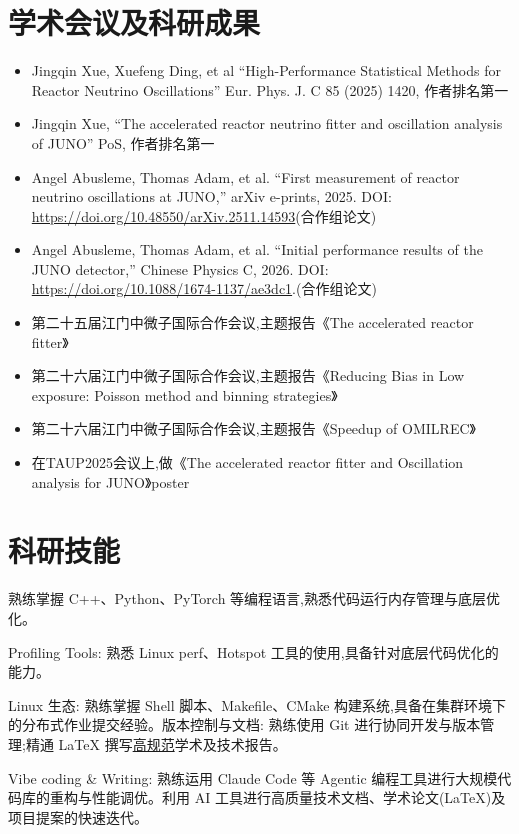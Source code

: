 \documentclass[a4paper,10.5pt]{article}
\begin{document}
\section*{学术会议及科研成果}

\begin{itemize}
    \item Jingqin Xue, Xuefeng Ding, et al ``High-Performance Statistical Methods for Reactor Neutrino Oscillations'' Eur. Phys. J. C 85 (2025) 1420, 作者排名第一
    \item Jingqin Xue, ``The accelerated reactor neutrino fitter and oscillation analysis of JUNO'' PoS, 作者排名第一
    \item Angel Abusleme, Thomas Adam, et al. ``First measurement of reactor neutrino oscillations at JUNO,'' arXiv e-prints, 2025. DOI: \url{https://doi.org/10.48550/arXiv.2511.14593}(合作组论文)
    \item Angel Abusleme, Thomas Adam, et al. ``Initial performance results of the JUNO detector,'' Chinese Physics C, 2026. DOI: \url{https://doi.org/10.1088/1674-1137/ae3dc1}.(合作组论文)
    \item 第二十五届江门中微子国际合作会议,主题报告《The accelerated reactor fitter》
    \item 第二十六届江门中微子国际合作会议,主题报告《Reducing Bias in Low exposure: Poisson method and binning strategies》
    \item 第二十六届江门中微子国际合作会议,主题报告《Speedup of OMILREC》
    \item 在TAUP2025会议上,做《The accelerated reactor fitter and Oscillation analysis for JUNO》poster
\end{itemize}

\section*{科研技能}

\begin{description}[leftmargin=0pt,labelindent=0pt,style=unboxed,itemsep=3pt]
    \item[\textbf{编程语言与框架:}] 熟练掌握 C++、Python、PyTorch 等编程语言,熟悉代码运行内存管理与底层优化。
    \item[\textbf{性能调优与调试:}] Profiling Tools: 熟悉 Linux perf、Hotspot 工具的使用,具备针对底层代码优化的能力。
    \item[\textbf{开发配套与环境:}] Linux 生态: 熟练掌握 Shell 脚本、Makefile、CMake 构建系统,具备在集群环境下的分布式作业提交经验。版本控制与文档: 熟练使用 Git 进行协同开发与版本管理;精通 LaTeX 撰写\underline{高规范}学术及技术报告。
    \item[\textbf{AI效能与辅助开发:}] Vibe coding \& Writing: 熟练运用 Claude Code 等 Agentic 编程工具进行大规模代码库的重构与性能调优。利用 AI 工具进行高质量技术文档、学术论文(LaTeX)及项目提案的快速迭代。
\end{description}
\end{document}
